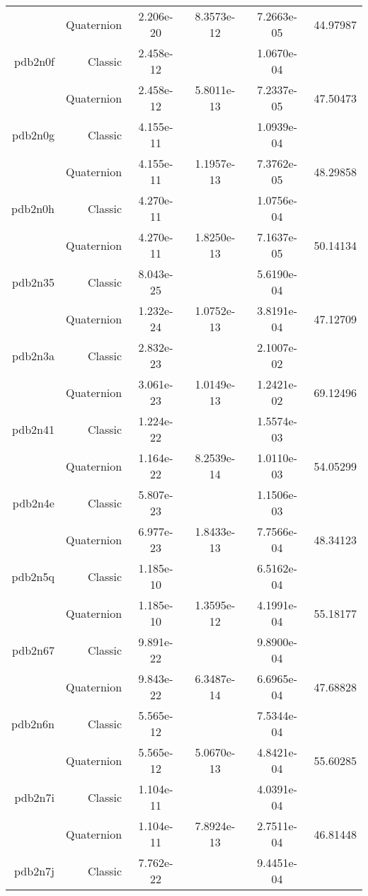\begin{xltabular}{\textwidth}{r|rS[table-format=1.3e+2]S[table-format=1.4e+2]S[table-format=1.4e+2]S[table-format=-1.5]}
& Quaternion & 2.206e-20 & 8.3573e-12 & 7.2663e-05 & 44.97987\\  \addlinespace
pdb2n0f & Classic & 2.458e-12 &  & 1.0670e-04 & \\
& Quaternion & 2.458e-12 & 5.8011e-13 & 7.2337e-05 & 47.50473\\  \addlinespace
pdb2n0g & Classic & 4.155e-11 &  & 1.0939e-04 & \\
& Quaternion & 4.155e-11 & 1.1957e-13 & 7.3762e-05 & 48.29858\\  \addlinespace
pdb2n0h & Classic & 4.270e-11 &  & 1.0756e-04 & \\
& Quaternion & 4.270e-11 & 1.8250e-13 & 7.1637e-05 & 50.14134\\  \addlinespace
pdb2n35 & Classic & 8.043e-25 &  & 5.6190e-04 & \\
& Quaternion & 1.232e-24 & 1.0752e-13 & 3.8191e-04 & 47.12709\\  \addlinespace
pdb2n3a & Classic & 2.832e-23 &  & 2.1007e-02 & \\
& Quaternion & 3.061e-23 & 1.0149e-13 & 1.2421e-02 & 69.12496\\  \addlinespace
pdb2n41 & Classic & 1.224e-22 &  & 1.5574e-03 & \\
& Quaternion & 1.164e-22 & 8.2539e-14 & 1.0110e-03 & 54.05299\\  \addlinespace
pdb2n4e & Classic & 5.807e-23 &  & 1.1506e-03 & \\
& Quaternion & 6.977e-23 & 1.8433e-13 & 7.7566e-04 & 48.34123\\  \addlinespace
pdb2n5q & Classic & 1.185e-10 &  & 6.5162e-04 & \\
& Quaternion & 1.185e-10 & 1.3595e-12 & 4.1991e-04 & 55.18177\\  \addlinespace
pdb2n67 & Classic & 9.891e-22 &  & 9.8900e-04 & \\
& Quaternion & 9.843e-22 & 6.3487e-14 & 6.6965e-04 & 47.68828\\  \addlinespace
pdb2n6n & Classic & 5.565e-12 &  & 7.5344e-04 & \\
& Quaternion & 5.565e-12 & 5.0670e-13 & 4.8421e-04 & 55.60285\\  \addlinespace
pdb2n7i & Classic & 1.104e-11 &  & 4.0391e-04 & \\
& Quaternion & 1.104e-11 & 7.8924e-13 & 2.7511e-04 & 46.81448\\  \addlinespace
pdb2n7j & Classic & 7.762e-22 &  & 9.4451e-04 & \\

\end{xltabular}

